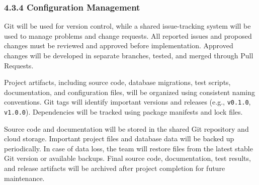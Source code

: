 \documentclass[12pt]{article}
\begin{document}
\subsubsection*{4.3.4 Configuration Management}
\par\medskip
Git will be used for version control, while a shared issue-tracking system will be used to manage problems and change requests. All reported issues and proposed changes must be reviewed and approved before implementation. Approved changes will be developed in separate branches, tested, and merged through Pull Requests.
\par\medskip
Project artifacts, including source code, database migrations, test scripts, documentation, and configuration files, will be organized using consistent naming conventions. Git tags will identify important versions and releases (e.g., \texttt{v0.1.0}, \texttt{v1.0.0}). Dependencies will be tracked using package manifests and lock files.
\par\medskip
Source code and documentation will be stored in the shared Git repository and cloud storage. Important project files and database data will be backed up periodically. In case of data loss, the team will restore files from the latest stable Git version or available backups. Final source code, documentation, test results, and release artifacts will be archived after project completion for future maintenance.
\par\medskip
\end{document}
